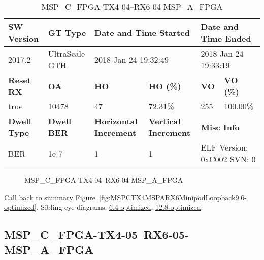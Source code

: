 \begin{table}[h]
\centering
\caption{MSP\_C\_FPGA-TX4-04--RX6-04-MSP\_A\_FPGA}
\label{tab:MSPCFPGATX404RX604MSPAFPGA9.6-optimized}
\begin{tabular}{@{}|l|l|l|l|l|l|@{}}
\toprule
\textbf{SW Version}                & \textbf{GT Type}   & \multicolumn{2}{l|}{\textbf{Date and Time Started}}            & \multicolumn{2}{l|}{\textbf{Date and Time Ended}}        \\ \midrule
2017.2                       & UltraScale GTH          & \multicolumn{2}{l|}{2018-Jan-24 19:32:49}                   & \multicolumn{2}{l|}{2018-Jan-24 19:33:19}               \\ \midrule
\textbf{Reset RX}                  & \textbf{OA} & \textbf{HO}   & \textbf{HO (\%)} & \textbf{VO} & \textbf{VO (\%)} \\ \midrule
true & 10478        & 47          & 72.31\%        & 255        & 100.00\%       \\ \midrule
\textbf{Dwell Type}                & \textbf{Dwell BER} & \textbf{Horizontal Increment} & \textbf{Vertical Increment}    & \multicolumn{2}{l|}{\textbf{Misc Info}}                  \\ \midrule
BER                            & 1e-7        & 1        & 1           & \multicolumn{2}{l|}{ELF Version: 0xC002 SVN: 0}                         \\ \bottomrule
\end{tabular}
\end{table}

\begin{figure}[h]
\caption{MSP\_C\_FPGA-TX4-04--RX6-04-MSP\_A\_FPGA} \label{fig:MSPCFPGATX404RX604MSPAFPGA9.6-optimized}
\end{figure}

Call back to summary Figure~\ref{fig:MSPCTX4MSPARX6MinipodLoopback9.6-optimized}.
Sibling eye diagrams: \hyperref[sec:MSPCFPGATX404RX604MSPAFPGA6.4-optimized]{6.4-optimized}, \hyperref[sec:MSPCFPGATX404RX604MSPAFPGA12.8-optimized]{12.8-optimized}.

\clearpage
\newpage


\subsection{MSP\_C\_FPGA-TX4-05--RX6-05-MSP\_A\_FPGA}\label{sec:MSPCFPGATX405RX605MSPAFPGA9.6-optimized}

